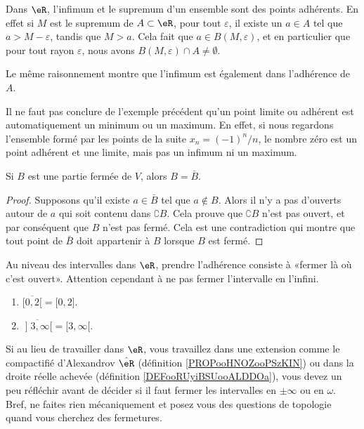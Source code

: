 \begin{example}
	Dans \( \eR\), l'infimum et le supremum d'un ensemble sont des points adhérents. En effet si \( M\) est le supremum de \( A\subset\eR\), pour tout \( \varepsilon\), il existe un \( a\in A\) tel que \( a>M-\varepsilon\), tandis que \( M>a\). Cela fait que \( a\in B(M,\varepsilon)\), et en particulier que pour tout rayon \( \varepsilon\), nous avons \( B(M,\varepsilon)\cap A\neq\emptyset\).

	Le même raisonnement montre que l'infimum est également dans l'adhérence de \( A\).
\end{example}

\begin{example}		\label{ParlerEncoredeF}
	Il ne faut pas conclure de l'exemple précédent qu'un point limite ou adhérent est automatiquement un minimum ou un maximum. En effet, si nous regardons l'ensemble formé par les points de la suite \( x_n=(-1)^n/n\), le nombre zéro est un point adhérent et une limite, mais pas un infimum ni un maximum.
\end{example}

\begin{lemma}
	Si \( B\) est une partie fermée de \( V\), alors \( B=\bar B\).
\end{lemma}

\begin{proof}
	Supposons qu'il existe \( a\in\bar B\) tel que \( a\notin B\). Alors il n'y a pas d'ouverts autour de \( a\) qui soit contenu dans \( \complement B\). Cela prouve que \( \complement B\) n'est pas ouvert, et par conséquent que \( B\) n'est pas fermé. Cela est une contradiction qui montre que tout point de \( \bar B\) doit appartenir à \( B\) lorsque \( B\) est fermé.
\end{proof}

\begin{example}
	Au niveau des intervalles dans \( \eR\), prendre l'adhérence consiste à «fermer là où c'est ouvert». Attention cependant à ne pas fermer l'intervalle en l'infini.
	\begin{enumerate}
		\item
		      \( \overline{ \mathopen[ 0 , 2 [ }=\mathopen[ 0 , 2 \mathclose]\).
		\item
		      \( \overline{ \mathopen] 3 , \infty \mathopen[ }=\mathopen[ 3 , \infty [\).
	\end{enumerate}
	Si au lieu de travailler dans \( \eR\), vous travaillez dans une extension comme le compactifié d'Alexandrov \( \hat \eR\) (définition \ref{PROPooHNOZooPSzKIN}) ou dans la droite réelle achevée (définition \ref{DEFooRUyiBSUooALDDOa}), vous devez un peu réfléchir avant de décider si il faut fermer les intervalles en \( \pm \infty\) ou en \( \omega\). Bref, ne faites rien mécaniquement et posez vous des questions de topologie quand vous cherchez des fermetures.
\end{example}

